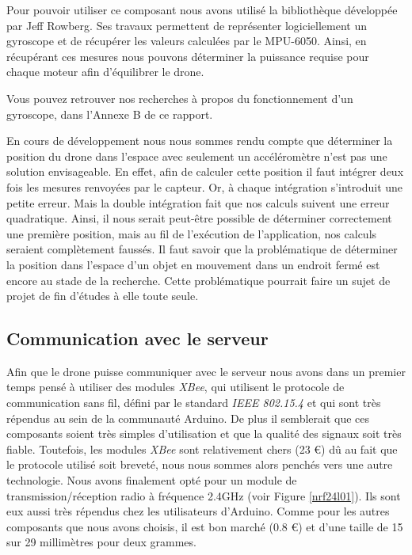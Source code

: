 \documentclass[a4paper,10pt]{report}
\begin{document}
	Pour pouvoir utiliser ce composant nous avons utilisé la bibliothèque 
développée par Jeff Rowberg\cite{jeff_rowberg_lib}. Ses travaux permettent de 
représenter logiciellement un gyroscope et de récupérer les valeurs calculées 
par le MPU-6050. Ainsi, en récupérant ces mesures nous pouvons déterminer la 
puissance requise pour chaque moteur afin d'équilibrer le drone.

	Vous pouvez retrouver nos recherches à propos du fonctionnement d'un 
gyroscope, dans l'Annexe B de ce rapport.

	En cours de développement nous nous sommes rendu compte que déterminer 
la position du drone dans l'espace avec seulement un accéléromètre n'est pas 
une solution envisageable. En effet, afin de calculer cette position il faut 
intégrer deux fois les mesures renvoyées par le capteur. Or, à chaque 
intégration s'introduit une petite erreur. Mais la double intégration fait que 
nos calculs suivent une erreur quadratique. Ainsi, il nous serait peut-être 
possible de déterminer correctement une première position, mais au fil de 
l'exécution de l'application, nos calculs seraient complètement faussés. Il 
faut savoir que la problématique de déterminer la position dans l'espace d'un 
objet en mouvement dans un endroit fermé est encore au stade de la recherche. 
Cette problématique pourrait faire un sujet de projet de fin d'études à elle 
toute seule.
      
      \subsection{Communication avec le serveur}
	Afin que le drone puisse communiquer avec le serveur nous avons dans un 
premier temps pensé à utiliser des modules \textit{XBee}, qui utilisent le 
protocole de communication sans fil, défini par le standard \textit{IEEE 
802.15.4} et qui sont très répendus au sein de la communauté Arduino. De plus 
il semblerait que ces composants soient très simples d'utilisation et que la 
qualité des signaux soit très fiable. Toutefois, les modules \textit{XBee} 
sont relativement chers (23 \euro) dû au fait que le protocole utilisé soit 
breveté, nous nous sommes alors penchés vers une autre technologie. Nous avons 
finalement opté pour un module de transmission/réception radio à fréquence 
2.4GHz (voir Figure \ref{nrf24l01}). Ils sont eux aussi très répendus chez les 
utilisateurs d'Arduino. Comme pour les autres composants que nous avons 
choisis, il est bon marché (0.8 \euro) et d'une taille de 15 sur 29 millimètres 
pour deux grammes.
	
\end{document}
